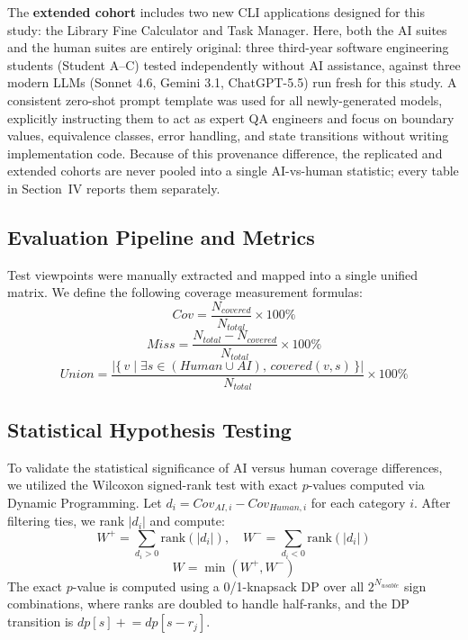 \documentclass[conference]{IEEEtran}
\begin{document}
The \textbf{extended cohort} includes two new CLI applications designed for this study: the Library Fine Calculator and Task Manager. Here, both the AI suites and the human suites are entirely original: three third-year software engineering students (Student A--C) tested independently without AI assistance, against three modern LLMs (Sonnet 4.6, Gemini 3.1, ChatGPT-5.5) run fresh for this study. A consistent zero-shot prompt template was used for all newly-generated models, explicitly instructing them to act as expert QA engineers and focus on boundary values, equivalence classes, error handling, and state transitions without writing implementation code. Because of this provenance difference, the replicated and extended cohorts are never pooled into a single AI-vs-human statistic; every table in Section~IV reports them separately.

\subsection{Evaluation Pipeline and Metrics}
Test viewpoints were manually extracted and mapped into a single unified matrix. We define the following coverage measurement formulas:
\begin{equation}
    Cov = \frac{N_{covered}}{N_{total}} \times 100\%
\end{equation}
\begin{equation}
    Miss = \frac{N_{total} - N_{covered}}{N_{total}} \times 100\%
\end{equation}
\begin{equation}
    Union = \frac{\left| \{\, v \mid \exists s \in (Human \cup AI),\, covered(v,s) \,\} \right|}{N_{total}} \times 100\%
\end{equation}

\subsection{Statistical Hypothesis Testing}
To validate the statistical significance of AI versus human coverage differences, we utilized the Wilcoxon signed-rank test with exact $p$-values computed via Dynamic Programming. Let $d_i = Cov_{AI,i} - Cov_{Human,i}$ for each category $i$. After filtering ties, we rank $|d_i|$ and compute:
\begin{equation}
    W^+ = \sum_{d_i > 0} \text{rank}(|d_i|), \quad W^- = \sum_{d_i < 0} \text{rank}(|d_i|)
\end{equation}
\begin{equation}
    W = \min(W^+, W^-)
\end{equation}
The exact $p$-value is computed using a 0/1-knapsack DP over all $2^{N_{usable}}$ sign combinations, where ranks are doubled to handle half-ranks, and the DP transition is $dp[s] \mathrel{+}= dp[s - r_j]$. 
\end{document}
